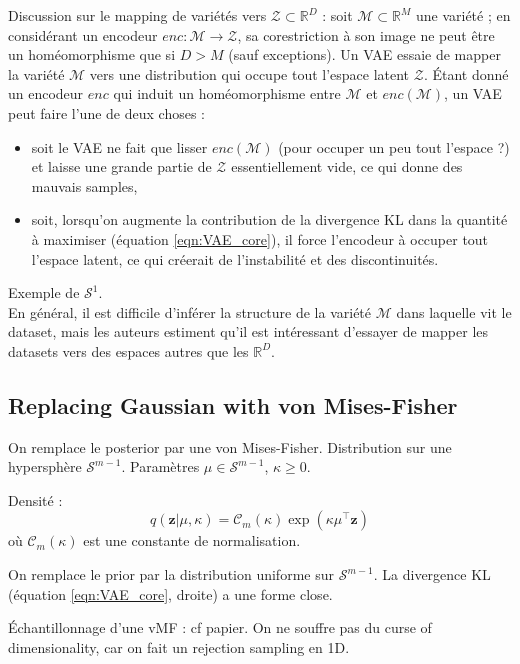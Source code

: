 \documentclass[a4paper]{article}
\begin{document}
	Discussion sur le mapping de variétés vers $\mathcal{Z} \subset \mathbb{R}^D$ : soit $\mathcal{M} \subset \mathbb{R}^M$ une variété ; en considérant un encodeur $enc : \mathcal{M} \to \mathcal{Z}$, sa corestriction à son image ne peut être un homéomorphisme que si $D > M$ (sauf exceptions). Un VAE essaie de mapper la variété $\mathcal{M}$ vers une distribution qui occupe tout l'espace latent $\mathcal{Z}$. Étant donné un encodeur $enc$ qui induit un homéomorphisme entre $\mathcal{M}$ et $enc(\mathcal{M})$, un VAE peut faire l'une de deux choses :
	\begin{itemize}
	\item soit le VAE ne fait que lisser $enc(\mathcal{M})$ (pour occuper un peu tout l'espace ?) et laisse une grande partie de $\mathcal{Z}$ essentiellement vide, ce qui donne des mauvais samples,
	\item soit, lorsqu'on augmente la contribution de la divergence KL dans la quantité à maximiser (équation \ref{eqn:VAE_core}), il force l'encodeur à occuper tout l'espace latent, ce qui créerait de l'instabilité et des discontinuités. 
	\end{itemize}
	Exemple de $\mathcal{S}^1$. \\
	En général, il est difficile d'inférer la structure de la variété $\mathcal{M}$ dans laquelle vit le dataset, mais les auteurs estiment qu'il est intéressant d'essayer de mapper les datasets vers des espaces autres que les $\mathbb{R}^D$.
	
	\subsection{Replacing Gaussian with von Mises-Fisher}
	
	On remplace le posterior par une von Mises-Fisher. Distribution sur une hypersphère $\mathcal{S}^{m-1}$. Paramètres $\mu \in \mathcal{S}^{m-1}$, $\kappa \geq 0$.
	
	Densité :
	\begin{equation}
	q(\mathbf{z}|\mu, \kappa) = \mathcal{C}_m(\kappa) \exp(\kappa \mu^\top \mathbf{z})
	\end{equation}
	où $\mathcal{C}_m(\kappa)$ est une constante de normalisation.
	
	On remplace le prior par la distribution uniforme sur $\mathcal{S}^{m-1}$. La divergence KL (équation \ref{eqn:VAE_core}, droite) a une forme close.
	
	Échantillonnage d'une vMF : cf papier. On ne souffre pas du curse of dimensionality, car on fait un rejection sampling en 1D.
\end{document}
